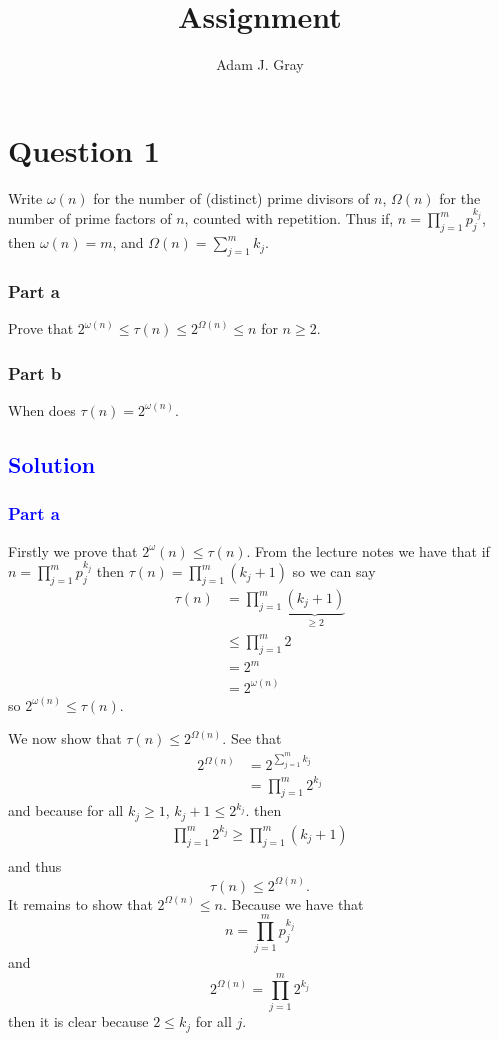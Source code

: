 \documentclass{unswmaths}
\begin{document}
\author{Adam J. Gray}
\subject{Number Theory}
\title{Assignment}

\unswtitle

\section*{Question 1}
Write $ \omega(n) $ for the number of (distinct) prime divisors of $ n $, 
$ \Omega(n) $ for the number of prime factors of $ n $, counted with 
repetition. Thus if, $ n = \prod_{j=1}^m p_j^{k_j} $, then $ \omega(n) = m $,
and $ \Omega(n) = \sum_{j=1}^{m} k_j $.
\subsubsection*{Part a}
Prove that $ 2^{\omega(n)} \leq \tau(n) \leq 2^{\Omega(n)} \leq n $ for 
$ n \geq 2 $.
\subsubsection*{Part b}
When does $ \tau(n) = 2^{\omega(n)} $.

\hrulefill

\subsection*{\textcolor{blue}{Solution}}
\subsubsection*{\textcolor{blue}{Part a}}
Firstly we prove that $ 2^\omega(n) \leq \tau(n) $. 
From the lecture notes we have that if $ n = \prod_{j=1}^m p_j^{k_j} $
then $ \tau(n) = \prod^{m}_{j=1}(k_j + 1) $ so we can say
\begin{align}
	\tau(n) 	&= \prod^{m}_{j=1}\underbrace{(k_j + 1)}_{\geq 2} \nonumber \\
				\label{ineq:qn1a}
				&\leq \prod^{m}_{j=1} 2 \\
				&= 2^m \nonumber \\
				&= 2^{\omega(n)} \nonumber
\end{align}
so $ 2^{\omega(n)} \leq \tau(n) $.

We now show that $ \tau(n) \leq 2^{\Omega(n)} $.
See that 
\begin{align*}
	2^{\Omega(n)} 	&= 2^{\sum_{j=1}^{m} k_j} \\
					&= \prod_{j=1}^{m}2^{k_j}
\end{align*}
and because for all $ k_j \geq 1 $, $ k_j + 1 \leq 2^{k_j} $.
then
\begin{align*}
	\prod_{j=1}^{m}2^{k_j}	\geq \prod_{j=1}^{m} (k_j + 1) \\
\end{align*}
and thus 
$$
	\tau(n) \leq 2^{\Omega(n)}.
$$
It remains to show that $ 2^{\Omega(n)} \leq n $.
Because we have that $$ n = \prod_{j=1}^m p_j^{k_j} $$ and $$ 2^{\Omega(n)} = \prod_{j=1}^{m}2^{k_j} $$
then it is clear because $ 2 \leq k_j $ for all $ j $. 
\end{document}
